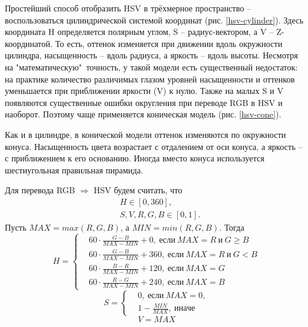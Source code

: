 Простейший способ отобразить HSV в трёхмерное пространство -- воспользоваться цилиндрической
системой координат (рис. \ref{hsv-cylinder}). 
Здесь координата H определяется полярным углом, S -- радиус-вектором, а V --
Z-координатой. То есть, оттенок изменяется при движении вдоль окружности цилиндра, насыщенность 
-- вдоль радиуса, а яркость -- вдоль высоты. Несмотря на "математическую"\ точность, у такой
модели есть существенный недостаток: на практике количество различимых глазом уровней 
насыщенности и оттенков уменьшается при приближении яркости (V) к нулю. Также на малых S и V 
появляются существенные ошибки округления при переводе RGB в HSV и наоборот. Поэтому чаще
применяется коническая модель (рис. \ref{hsv-cone}).


Как и в цилиндре, в конической модели оттенок изменяются по окружности конуса. Насыщенность 
цвета возрастает с отдалением от оси конуса, а яркость -- с приближением к его основанию. Иногда
вместо конуса используется шестиугольная правильная пирамида.


Для перевода RGB $\Rightarrow$ HSV будем считать, что
$$
\begin{aligned}
	&H \in [0, 360], \\
	&S, V, R, G, B \in [0, 1].
\end{aligned}
$$
Пусть $MAX=max(R, G, B)$, а $MIN=min(R, G, B)$.
Тогда
\begin{equation}
	H=\left\{\begin{aligned}
	&60 \cdot \frac{G-B}{MAX-MIN}+0,~ если~MAX=R~и~G \geq B \\
	&60 \cdot \frac{G-B}{MAX-MIN}+360,~ если~MAX=R~и~G < B \\
	&60 \cdot \frac{B-R}{MAX-MIN}+120,~ если~MAX=G \\
	&60 \cdot \frac{R-G}{MAX-MIN}+240,~ если~MAX=B
\end{aligned}\right. 
\label{h-in-hsv}
\end{equation}
\begin{equation}
	S=\left\{\begin{aligned}
	&0,~если~MAX=0, \\
	&1-\frac{MIN}{MAX},~иначе
\end{aligned}\right.
\label{s-in-hsv}
\end{equation}
\begin{equation}
	V=MAX
	\label{v-in-hsv}
\end{equation}

